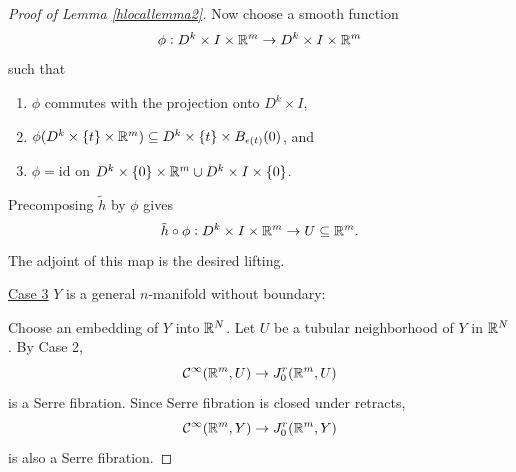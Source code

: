 \documentclass{article}
\newtheorem{proposed work}[theorem]{Proposed Work}
\theoremstyle{definition}
\begin{document}
\begin{proof}[Proof of Lemma \ref{hlocallemma2}]
Now choose a smooth function
\begin{equation*}
\phi: D^k \times I \times \mathbb R^m \to D^k \times I \times \mathbb R^m
\end{equation*}
such that
\begin{enumerate}
\item $\phi$ commutes with the projection onto $D^k\times I$,
\item
$\phi(D^k \times \{t\} \times \mathbb R^m) \subseteq D^k \times \{t\} \times
B_{\epsilon(t)}(0)$, and
\item $\phi = \mathrm{id}$ on
$D^k\times\{0\}\times\mathbb R^m \cup D^k\times I \times\{0\}$.
\end{enumerate}

Precomposing $\tilde{h}$ by $\phi$ gives
\begin{equation*}
\tilde{h} \circ \phi: D^k \times I \times \mathbb R^m \to U \subseteq \mathbb R^m.
\end{equation*}
The adjoint of this map is the desired lifting.
\newline

\noindent\underline{Case 3} $Y$ is a general $n$-manifold without
boundary:
\newline

Choose an embedding of $Y$ into $\mathbb R^N$. Let $U$ be a tubular
neighborhood of $Y$ in $\mathbb R^N$. By Case 2,
\begin{equation*}
\mathcal C^\infty(\mathbb R^m, U) \to J_0^r(\mathbb R^m,U)
\end{equation*}
is a Serre fibration. Since Serre fibration is closed under
retracts,
\begin{equation*}
\mathcal C^\infty(\mathbb R^m, Y) \to J_0^r(\mathbb R^m,Y)
\end{equation*}
is also a Serre fibration.
\end{proof}
\end{document}

